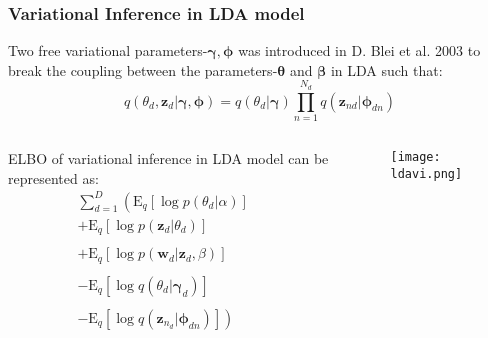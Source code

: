 \documentclass[10pt]{beamer}
\newcommand{\bs}{\boldsymbol}
\newcommand{\ba}{\begin{array}}
\newcommand{\ea}{\end{array}}
\newcommand{\E}{\mathrm{E}}
\newcommand{\Sum}{\displaystyle\sum}
\newcommand{\Prod}{\displaystyle\prod}
\begin{document}
\begin{frame}
	\frametitle{Variational Inference in LDA model }
	Two free variational parameters-$\bs{\gamma},\bs{\phi}$ was introduced in D. Blei et al. 2003 to break the coupling between the parameters-$\bs{\theta}$ and $\bs{\beta}$ in LDA such that:\\
	\[
	q(\theta_d,\bs{z}_d|\bs{\gamma},\bs{\phi})=q(\theta_d|\bs{\gamma})\Prod_{n=1}^{N_d}q(\bs{z}_{nd}|\bs{\phi}_{dn})
	\]	
\begin{columns}[T] %
\begin{column}{.61\textwidth}
			ELBO of variational inference in LDA model can be represented as:
\begin{equation*}
\ba{cl}
\Sum_{d=1}^{D}\left(\E_{q}[\log p(\theta_d|\alpha)]\right.&\\
+\E_{q}[\log p(\bs{z}_d|\theta_d)]&\\
&\\
+\E_{q}[\log p(\bs{w}_d|\bs{z}_d,\beta)]&\\
&\\
-\E_{q}[\log q(\theta_d|\bs{\gamma}_d)]&\\
&\\
-\left.\E_{q}[\log q(\bs{z}_{n_d}|\bs{\phi}_{dn})]\right)
\ea
\end{equation*}			
\end{column}%
		
\begin{column}{.39\textwidth}
	\begin{figure}[b]
		\texttt{[image: ldavi.png]}
		\centering
	\end{figure}
\end{column}%
\end{columns}	
\end{frame}		
\end{document}
